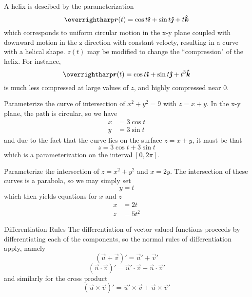 \documentclass[../main.tex]{subfiles}
\begin{document}
        A helix is descibed by the parameterization
        \begin{equation*}
                \vec{r}(t) = \cos{t}\i + \sin{t}\j + t\k
        \end{equation*}
        which corresponds to uniform circular motion in the x-y plane coupled with downward motion in the z direction with constant velocty, resulting in a curve with a helical shape. \(z(t)\) may be modified to change the ``compression" of the helix. For instance,
        \begin{equation*}                        
                \vec{r}(t) = \cos{t}\i + \sin{t}\j + t^3\k
        \end{equation*}
        is much less compressed at large values of \(z\), and highly compressed near \(0\).
        \begin{example}{}{}
        Parameterize the curve of intersection of \(x^2+y^2=9\) with \(z = x + y\).
        \tcblower
        In the x-y plane, the path is circular, so we have
        \begin{align*}
                x &= 3\cos{t}\\
                y &= 3\sin{t}
        \end{align*}
        and due to the fact that the curve lies on the surface \(z = x + y\), it must be that
        \[z = 3\cos{t} + 3\sin{t}\]
        which is a parameterization on the interval \([0,2\pi]\).
        \end{example}
        \begin{example}{}{}
        Parameterize the intersection of \(z = x^2 + y^2\) and \(x = 2y\).
        \tcblower
        The intersection of these curves is a parabola, so we may simply set
        \[y=t\]
        which then yields equations for \(x\) and \(z\)
        \begin{align*}
                x &= 2t\\
                z &= 5t^2
        \end{align*}
        \end{example}
        \begin{definition}{Differentiation Rules}{}
                The differentiation of vector valued functions proceeds by differentiating each of the components, so the normal rules of differentiation apply, namely
                \[(\vec{u}+\vec{v})' = \vec{u}' + \vec{v}'\]
                \[(\vec{u}\cdot\vec{v})' = \vec{u}'\cdot\vec{v}+\vec{u}\cdot\vec{v}'\]
                and similarly for the cross product
                \[(\vec{u}\times\vec{v})' = \vec{u}'\times\vec{v}+\vec{u}\times\vec{v}'\]
        \end{definition}
\end{document}
